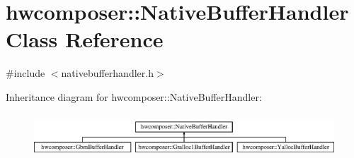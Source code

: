 \hypertarget{classhwcomposer_1_1NativeBufferHandler}{}\section{hwcomposer\+:\+:Native\+Buffer\+Handler Class Reference}
\label{classhwcomposer_1_1NativeBufferHandler}


{\ttfamily \#include $<$nativebufferhandler.\+h$>$}

Inheritance diagram for hwcomposer\+:\+:Native\+Buffer\+Handler\+:\begin{figure}[H]
\begin{center}
\leavevmode
\includegraphics[height=1.659259cm]{classhwcomposer_1_1NativeBufferHandler}
\end{center}
\end{figure}
